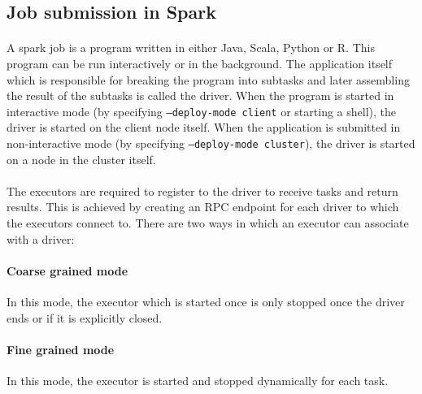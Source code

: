 \subsection{Job submission in Spark}

\paragraph{} A \gls{spark} job is a program written in either Java, Scala,
Python or R. This program can be run interactively or in the background. The
application itself which is responsible for breaking the program into subtasks
and later assembling the result of the subtasks is called the \gls{driver}. When
the program is started in interactive mode (by specifying
\texttt{--deploy-mode client} or starting a shell), the driver is started on the
client node itself. When the application is submitted in non-interactive mode
(by specifying \texttt{--deploy-mode cluster}), the driver is started on a node
in the cluster itself.

\paragraph{} The \glspl{executor} are required to register to the \gls{driver}
to receive tasks and return results. This is achieved by creating an RPC
endpoint for each \gls{driver} to which the \glspl{executor} connect to. There
are two ways in which an \gls{executor} can associate with a \gls{driver}:

\paragraph{Coarse grained mode} In this mode, the \gls{executor} which is
started once is only stopped once the \gls{driver} ends or if it is explicitly
closed.

\paragraph{Fine grained mode} In this mode, the \gls{executor} is started and
stopped dynamically for each task.
